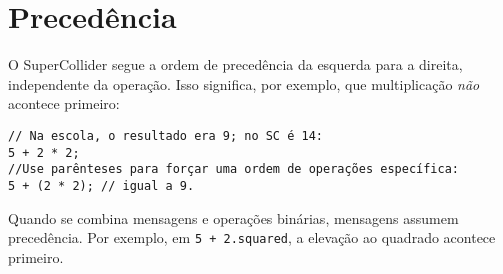 \section{Precedência}

O SuperCollider segue a ordem de precedência da esquerda para a direita, independente da operação. Isso significa, por exemplo, que multiplicação \emph{não} acontece primeiro:

\begin{lstlisting}[style=SuperCollider-IDE, basicstyle=\scttfamily\footnotesize]
// Na escola, o resultado era 9; no SC é 14:
5 + 2 * 2; 
//Use parênteses para forçar uma ordem de operações específica:
5 + (2 * 2); // igual a 9.
\end{lstlisting}

Quando se combina mensagens e operações binárias, mensagens assumem precedência. Por exemplo, em \texttt{5 + 2.squared}, a elevação ao quadrado acontece primeiro.
